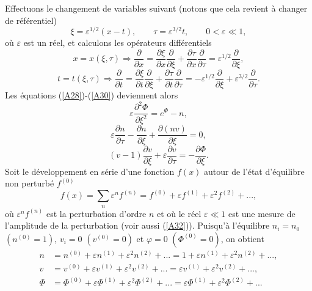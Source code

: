 \documentclass[10pt,thmsa]{article}
\begin{document}
Effectuons le changement de variables suivant (notons que cela revient \`{a}
changer de r\'{e}f\'{e}rentiel)
\begin{equation}
\xi=\varepsilon^{1/2}(x-t),\qquad\tau=\varepsilon^{3/2}t,\qquad0<\varepsilon
\ll1,\label{A32}%
\end{equation}
o\`{u} $\varepsilon$ est un r\'{e}el, et calculons les op\'{e}rateurs
diff\'{e}rentiels
\begin{equation}
x=x(\xi,\tau)\Rightarrow\frac{\partial}{\partial x}=\frac{\partial\xi
}{\partial x}\frac{\partial}{\partial\xi}+\frac{\partial\tau}{\partial x}%
\frac{\partial}{\partial\tau}=\varepsilon^{1/2}\frac{\partial}{\partial\xi
},\label{A33}%
\end{equation}
\begin{equation}
t=t(\xi,\tau)\Rightarrow\frac{\partial}{\partial t}=\frac{\partial\xi
}{\partial t}\frac{\partial}{\partial\xi}+\frac{\partial\tau}{\partial t}%
\frac{\partial}{\partial\tau}=-\varepsilon^{1/2}\frac{\partial}{\partial\xi
}+\varepsilon^{3/2}\frac{\partial}{\partial\tau}.\label{A34}%
\end{equation}
Les \'{e}quations (\ref{A28})-(\ref{A30}) deviennent alors
\begin{equation}
\varepsilon\frac{\partial^{2}\Phi}{\partial\xi^{2}}=e^{\Phi}-n,\label{A35}%
\end{equation}
\begin{equation}
\varepsilon\frac{\partial n}{\partial\tau}-\frac{\partial n}{\partial\xi
}+\frac{\partial(nv)}{\partial\xi}=0,\label{A36}%
\end{equation}
\begin{equation}
(v-1)\frac{\partial v}{\partial\xi}+\varepsilon\frac{\partial v}{\partial\tau
}=-\frac{\partial\Phi}{\partial\xi}.\label{A37}%
\end{equation}
Soit le d\'{e}veloppement en s\'{e}rie d'une fonction $f(x)$ autour de
l'\'{e}tat d'\'{e}quilibre non perturb\'{e} $f^{(0)}$
\begin{equation}
f(x)=\underset{n}{\sum}\varepsilon^{n}f^{(n)}=f^{(0)}+\varepsilon
f^{(1)}+\varepsilon^{2}f^{(2)}+...,\label{A38}%
\end{equation}
o\`{u} $\varepsilon^{n}f^{(n)}$ est la perturbation d'ordre $n$ et o\`{u} le
r\'{e}el $\varepsilon\ll1$ est une mesure de l'amplitude de la perturbation
(voir aussi (\ref{A32})). Puisqu'\`{a} l'\'{e}quilibre $n_{i}=n_{0}$
$(n^{(0)}=1)$, $v_{i}=0$ $(v^{(0)}=0)$ et $\varphi=0$ $(\Phi^{(0)}=0)$, on
obtient
\begin{align}
n  & =n^{(0)}+\varepsilon n^{(1)}+\varepsilon^{2}n^{(2)}+...=1+\varepsilon
n^{(1)}+\varepsilon^{2}n^{(2)}+...,\label{A39}\\
v  & =v^{(0)}+\varepsilon v^{(1)}+\varepsilon^{2}v^{(2)}+...=\varepsilon
v^{(1)}+\varepsilon^{2}v^{(2)}+...,\label{A40}\\
\Phi & =\Phi^{(0)}+\varepsilon\Phi^{(1)}+\varepsilon^{2}\Phi^{(2)}%
+...=\varepsilon\Phi^{(1)}+\varepsilon^{2}\Phi^{(2)}+...\label{A41}%
\end{align}
\end{document}
